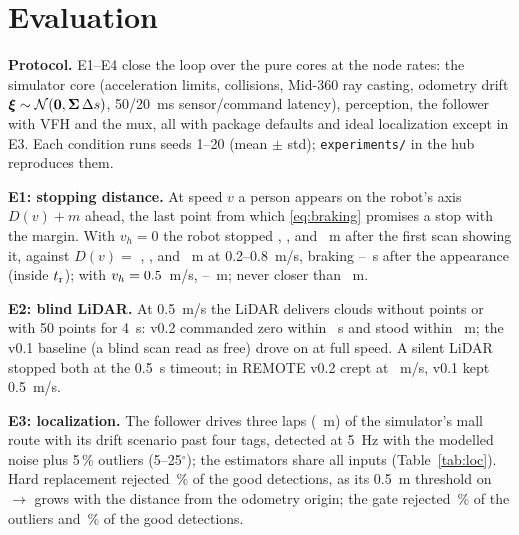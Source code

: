 \section{Evaluation}
\label{sec:eval}



\textbf{Protocol.} E1--E4 close the loop over the pure cores at the node rates: the simulator
core (acceleration limits, collisions, Mid-360 ray casting, odometry drift
$\boldsymbol{\xi} \sim \mathcal{N}(\boldsymbol{0}, \boldsymbol{\Sigma}\,\Delta s)$, 50/20~ms sensor/command
latency), perception, the follower with VFH and the mux, all with package defaults and ideal
localization except in E3. Each condition runs seeds 1--20 (mean $\pm$ std);
\texttt{experiments/} in the hub reproduces them.

\textbf{E1: stopping distance.} At speed $v$ a person appears on the robot's axis $D(v) + m$
ahead, the last point from which \eqref{eq:braking} promises a stop with the margin. With
$v_h = 0$ the robot stopped \EOneZeroMeasuredA, \EOneZeroMeasuredB, \EOneZeroMeasuredC{} and
\EOneZeroMeasuredD~m after the first scan showing it, against
$D(v) =$ \EOneZeroModelA, \EOneZeroModelB, \EOneZeroModelC{} and \EOneZeroModelD~m at
0.2--0.8~m/s, braking \EOneZeroReactMin--\EOneZeroReactMax~s after the appearance (inside
$t_{\mathrm{r}}$); with $v_h = 0.5$~m/s, \EOneMeasuredA--\EOneMeasuredD~m; never closer than
\EOneZeroClearMin~m.

\textbf{E2: blind LiDAR.} At 0.5~m/s the LiDAR delivers clouds without points or with 50
points for 4~s: v0.2 commanded zero within \ETwoBlindZeroMax~s and stood within
\ETwoBlindDistanceMax~m; the v0.1 baseline (a blind scan read as free) drove on at full speed.
A silent LiDAR stopped both at the 0.5~s timeout; in REMOTE v0.2 crept at \ETwoCreepMax~m/s,
v0.1 kept 0.5~m/s.

\textbf{E3: localization.} The follower drives three laps (\EThreeDistance~m) of the
simulator's mall route with its drift scenario past four tags, detected at 5~Hz with the
modelled noise plus 5\,\% outliers (5--25$^\circ$); the estimators share all inputs
(Table~\ref{tab:loc}). Hard
replacement rejected \EThreeHardReplaceInliersRejected\,\% of the good detections, as its
0.5~m threshold on $\to$ grows with the distance from the odometry origin;
the gate rejected \EThreeEkfTagsOutliersRejected\,\% of the outliers and
\EThreeEkfTagsInliersRejected\,\% of the good detections.

\begin{table}[t]
  \centering
  \caption{E3: position RMSE (ATE), largest position error, heading RMSE}
  \label{tab:loc}
  \footnotesize
  
\end{table}

